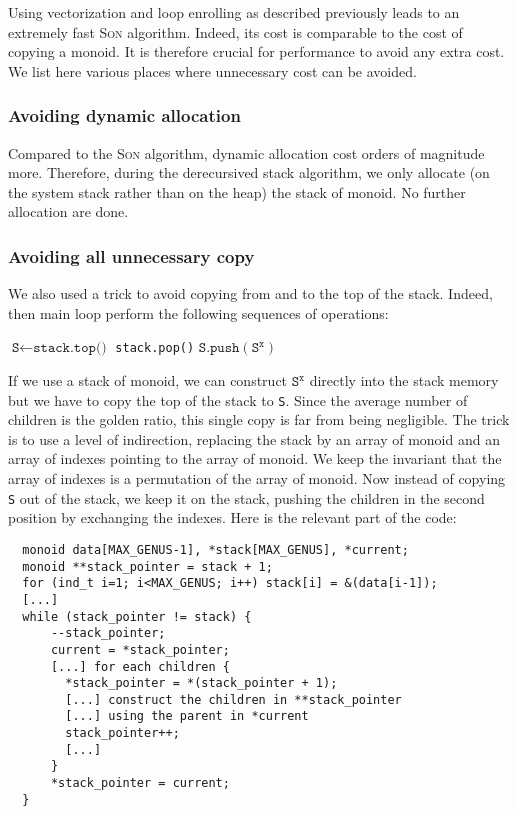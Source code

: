\documentclass[reqno,11pt]{amsart}
\theoremstyle{plain}
\theoremstyle{definition}
\renewcommand{\tt}[1]{\texttt{#1}}
\begin{document}
Using vectorization and loop enrolling as described previously leads to an
extremely fast \textsc{Son} algorithm. Indeed, its cost is comparable to the cost
of copying a monoid. It is therefore crucial for performance to avoid any
extra cost. We list here various places where unnecessary cost can be avoided.

\subsubsection*{Avoiding dynamic allocation} Compared to the \textsc{Son}
algorithm, dynamic allocation cost orders of magnitude more. Therefore, during
the derecursived stack algorithm, we only allocate (on the system stack rather
than on the heap) the stack of monoid. No further allocation are done.

\subsubsection*{Avoiding all unnecessary copy} We also used a trick to avoid
copying from and to the top of the stack. Indeed, then main loop perform the
following sequences of operations:
{\small
\begin{algorithmic}
  \State $\tt{S} \gets \tt{stack.top()}$
  \State \tt{stack.pop()}
  \For{all children $\tt{S}^\tt{x}$ of \tt{S}}
  \State $\tt{S.push}(\tt{S}^\tt{x})$
  \EndFor
\end{algorithmic}
}
If we use a stack of monoid, we can construct $\tt{S}^\tt{x}$ directly into
the stack memory but we have to copy the top of the stack to \tt{S}. Since the
average number of children is the golden ratio, this single copy is far from
being negligible. The trick is to use a level of indirection, replacing the
stack by an array of monoid and an array of indexes pointing to the array of
monoid. We keep the invariant that the array of indexes is a permutation of
the array of monoid. Now instead of copying \tt{S} out of the stack, we keep
it on the stack, pushing the children in the second position by exchanging the
indexes. Here is the relevant part of the code:

{\small
\begin{verbatim}
  monoid data[MAX_GENUS-1], *stack[MAX_GENUS], *current;
  monoid **stack_pointer = stack + 1;
  for (ind_t i=1; i<MAX_GENUS; i++) stack[i] = &(data[i-1]);
  [...]
  while (stack_pointer != stack) {
      --stack_pointer;
      current = *stack_pointer;
      [...] for each children {
        *stack_pointer = *(stack_pointer + 1);
        [...] construct the children in **stack_pointer
        [...] using the parent in *current
        stack_pointer++;
        [...]
      }
      *stack_pointer = current;
  }
\end{verbatim}
}
\end{document}
